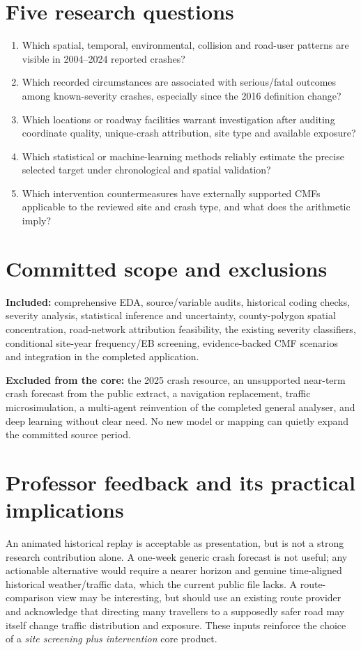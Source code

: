 \documentclass[11pt,a4paper,openany]{report}
\begin{document}
\section{Five research questions}
\begin{enumerate}
\item Which spatial, temporal, environmental, collision and road-user patterns are visible in 2004--2024 reported crashes?
\item Which recorded circumstances are associated with serious/fatal outcomes among known-severity crashes, especially since the 2016 definition change?
\item Which locations or roadway facilities warrant investigation after auditing coordinate quality, unique-crash attribution, site type and available exposure?
\item Which statistical or machine-learning methods reliably estimate the precise selected target under chronological and spatial validation?
\item Which intervention countermeasures have externally supported CMFs applicable to the reviewed site and crash type, and what does the arithmetic imply?
\end{enumerate}

\section{Committed scope and exclusions}
\textbf{Included:} comprehensive EDA, source/variable audits, historical coding checks, severity analysis, statistical inference and uncertainty, county-polygon spatial concentration, road-network attribution feasibility, the existing severity classifiers, conditional site-year frequency/EB screening, evidence-backed CMF scenarios and integration in the completed application.

\textbf{Excluded from the core:} the 2025 crash resource, an unsupported near-term crash forecast from the public extract, a navigation replacement, traffic microsimulation, a multi-agent reinvention of the completed general analyser, and deep learning without clear need. No new model or mapping can quietly expand the committed source period.

\section{Professor feedback and its practical implications}
An animated historical replay is acceptable as presentation, but is not a strong research contribution alone. A one-week generic crash forecast is not useful; any actionable alternative would require a nearer horizon and genuine time-aligned historical weather/traffic data, which the current public file lacks. A route-comparison view may be interesting, but should use an existing route provider and acknowledge that directing many travellers to a supposedly safer road may itself change traffic distribution and exposure. These inputs reinforce the choice of a \emph{site screening plus intervention} core product.
\end{document}

